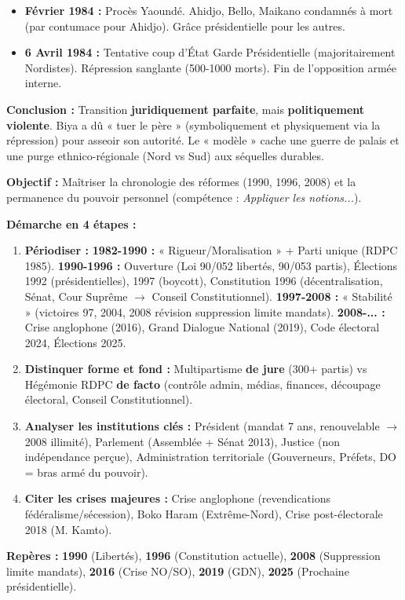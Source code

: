 \documentclass[11pt]{article}
\begin{document}
\begin{exoresolu}
\begin{itemize}
    \item \textbf{Février 1984 :} Procès Yaoundé. Ahidjo, Bello, Maikano condamnés à mort (par contumace pour Ahidjo). Grâce présidentielle pour les autres.
    \item \textbf{6 Avril 1984 :} Tentative coup d'État Garde Présidentielle (majoritairement Nordistes). Répression sanglante (500-1000 morts). Fin de l'opposition armée interne.
\end{itemize}
\textbf{Conclusion :} Transition \textbf{juridiquement parfaite}, mais \textbf{politiquement violente}. Biya a dû « tuer le père » (symboliquement et physiquement via la répression) pour asseoir son autorité. Le « modèle » cache une guerre de palais et une purge ethnico-régionale (Nord vs Sud) aux séquelles durables.
\end{exoresolu}

\begin{methode}
\textbf{Objectif :} Maîtriser la chronologie des réformes (1990, 1996, 2008) et la permanence du pouvoir personnel (compétence : \emph{Appliquer les notions...}).
\par
\textbf{Démarche en 4 étapes :}
\begin{enumerate}
    \item \textbf{Périodiser :} \textbf{1982-1990 :} « Rigueur/Moralisation » + Parti unique (RDPC 1985). \textbf{1990-1996 :} Ouverture (Loi 90/052 libertés, 90/053 partis), Élections 1992 (présidentielles), 1997 (boycott), Constitution 1996 (décentralisation, Sénat, Cour Suprême $\rightarrow$ Conseil Constitutionnel). \textbf{1997-2008 :} « Stabilité » (victoires 97, 2004, 2008 révision suppression limite mandats). \textbf{2008-... :} Crise anglophone (2016), Grand Dialogue National (2019), Code électoral 2024, Élections 2025.
    \item \textbf{Distinquer forme et fond :} Multipartisme \textbf{de jure} (300+ partis) vs Hégémonie RDPC \textbf{de facto} (contrôle admin, médias, finances, découpage électoral, Conseil Constitutionnel).
    \item \textbf{Analyser les institutions clés :} Président (mandat 7 ans, renouvelable $\rightarrow$ 2008 illimité), Parlement (Assemblée + Sénat 2013), Justice (non indépendance perçue), Administration territoriale (Gouverneurs, Préfets, DO = bras armé du pouvoir).
    \item \textbf{Citer les crises majeures :} Crise anglophone (revendications fédéralisme/sécession), Boko Haram (Extrême-Nord), Crise post-électorale 2018 (M. Kamto).
\end{enumerate}
\textbf{Repères :} \textbf{1990} (Libertés), \textbf{1996} (Constitution actuelle), \textbf{2008} (Suppression limite mandats), \textbf{2016} (Crise NO/SO), \textbf{2019} (GDN), \textbf{2025} (Prochaine présidentielle).
\end{methode}
\end{document}
